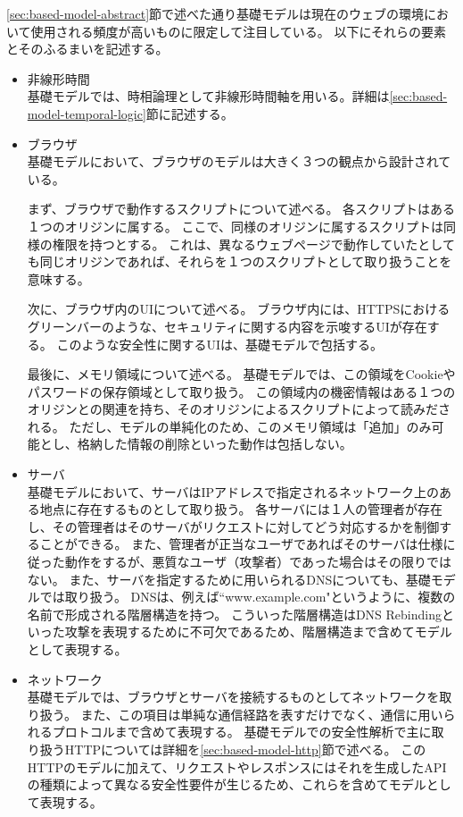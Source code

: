 \documentclass[12pt,a4paper]{jbook}
\begin{document}
\ref{sec:based-model-abstract}節で述べた通り基礎モデルは現在のウェブの環境において使用される頻度が高いものに限定して注目している。
以下にそれらの要素とそのふるまいを記述する。
\begin{itemize}
\item 非線形時間 \\
基礎モデルでは、時相論理として非線形時間軸を用いる。詳細は\ref{sec:based-model-temporal-logic}節に記述する。
\item ブラウザ \\
基礎モデルにおいて、ブラウザのモデルは大きく３つの観点から設計されている。

まず、ブラウザで動作するスクリプトについて述べる。
各スクリプトはある１つのオリジンに属する。
ここで、同様のオリジンに属するスクリプトは同様の権限を持つとする。
これは、異なるウェブページで動作していたとしても同じオリジンであれば、それらを１つのスクリプトとして取り扱うことを意味する。

次に、ブラウザ内のUIについて述べる。
ブラウザ内には、HTTPSにおけるグリーンバーのような、セキュリティに関する内容を示唆するUIが存在する。
このような安全性に関するUIは、基礎モデルで包括する。

最後に、メモリ領域について述べる。
基礎モデルでは、この領域をCookieやパスワードの保存領域として取り扱う。
この領域内の機密情報はある１つのオリジンとの関連を持ち、そのオリジンによるスクリプトによって読みだされる。
ただし、モデルの単純化のため、このメモリ領域は「追加」のみ可能とし、格納した情報の削除といった動作は包括しない。
\item サーバ \\
基礎モデルにおいて、サーバはIPアドレスで指定されるネットワーク上のある地点に存在するものとして取り扱う。
各サーバには１人の管理者が存在し、その管理者はそのサーバがリクエストに対してどう対応するかを制御することができる。
また、管理者が正当なユーザであればそのサーバは仕様に従った動作をするが、悪質なユーザ（攻撃者）であった場合はその限りではない。
また、サーバを指定するために用いられるDNSについても、基礎モデルでは取り扱う。
DNSは、例えば``www.example.com"というように、複数の名前で形成される階層構造を持つ。
こういった階層構造はDNS Rebinding\cite{dns-rebinding}といった攻撃を表現するために不可欠であるため、階層構造まで含めてモデルとして表現する。
\item ネットワーク \\
基礎モデルでは、ブラウザとサーバを接続するものとしてネットワークを取り扱う。
また、この項目は単純な通信経路を表すだけでなく、通信に用いられるプロトコルまで含めて表現する。
基礎モデルでの安全性解析で主に取り扱うHTTPについては詳細を\ref{sec:based-model-http}節で述べる。
このHTTPのモデルに加えて、リクエストやレスポンスにはそれを生成したAPIの種類によって異なる安全性要件が生じるため、これらを含めてモデルとして表現する。
\end{itemize}
\end{document}
